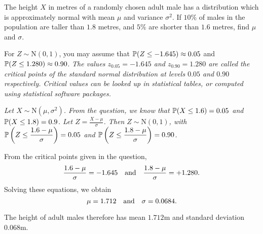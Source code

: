 \begin{example}
The height $X$ in metres of a randomly chosen adult male has a distribution which is approximately normal with mean $\mu$ and variance $\sigma^2$. If $10\%$ of males in the population are taller than $1.8$ metres, and $5\%$ are shorter than $1.6$ metres, find $\mu$ and $\sigma$. 

\vspace{2ex}
For $Z\sim\text{N}(0,1)$, you may assume that $\mathbb{P}(Z\leq -1.645)	\approx 0.05$ and $\mathbb{P}(Z\leq 1.280) \approx 0.90$.
\bit
\it The values $z_{0.05} = -1.645$ and $z_{0.90} = 1.280$ are called the \emph{critical points} of the standard normal distribution at levels $0.05$ and $0.90$ respectively. 
\it Critical values can be looked up in statistical tables, or computed using statistical software packages.
\eit

%
\end{example}

\begin{solution}
\bit
\it Let $X\sim\text{N}(\mu,\sigma^2)$. 
\eit
From the question, we know that $\mathbb{P}(X\leq 1.6) = 0.05$ and $\mathbb{P}(X\leq 1.8)=0.9$.
\bit
\it Let $Z=\displaystyle\frac{X-\mu}{\sigma}$. 
\eit
Then $Z\sim\text{N}(0,1)$, with
$\mathbb{P}\left(Z\leq \displaystyle\frac{1.6-\mu}{\sigma}\right) = 0.05$ and
$\mathbb{P}\left(Z\leq \displaystyle\frac{1.8-\mu}{\sigma}\right) = 0.90$.

\vspace{2ex}
From the critical points given in the question,
\[
\displaystyle\frac{1.6-\mu}{\sigma} = -1.645 \text{\quad and\quad} \displaystyle\frac{1.8-\mu}{\sigma} = +1.280.
\]
Solving these equations, we obtain
\[
\mu=1.712 \text{\quad and\quad} \sigma=0.0684.
\]

The height of adult males therefore has mean $1.712$m and standard deviation $0.068$m.
\end{solution}


